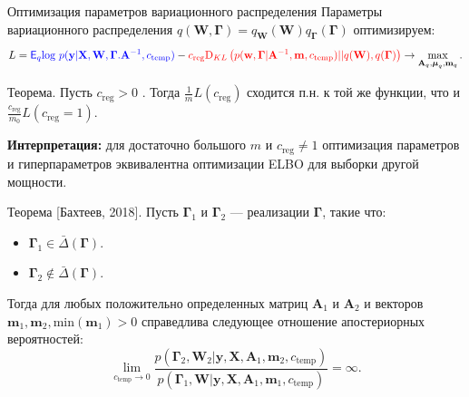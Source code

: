 \documentclass[usenames,dvipsnames,10pt,pdf,utf8,russian,aspectratio=43]{beamer}
\begin{document}
\begin{frame}{Оптимизация параметров вариационного распределения}
\footnotesize
Параметры вариационного распределения $q(\mathbf{W}, \boldsymbol{\Gamma}) = q_{\mathbf{W}}(\mathbf{W})q_{\boldsymbol{\Gamma}}(\boldsymbol{\Gamma})$ оптимизируем:
\[
L =
\textcolor{blue}{\mathsf{E}_q \text{log}~{p(\mathbf{y} | \mathbf{X}, \mathbf{W}, \boldsymbol{\Gamma}. \mathbf{A}^{-1}, c_{\text{temp}})}} - \textcolor{red}{c_\text{reg}\text{D}_{KL}\left(p(\mathbf{w}, \boldsymbol{\Gamma} |\mathbf{A}^{-1}, \mathbf{m}, c_{\text{temp}}) || q(\mathbf{W}), q(\boldsymbol{\Gamma})\right)} \to \max_{\mathbf{A}_q, \boldsymbol{\mu}_q, \mathbf{m}_q}.
\]

\begin{block}{Теорема.}
Пусть $c_\text{reg} > 0$ .
Тогда $\frac{1}{m}L(c_\text{reg})$ сходится п.н. к той же функции, что и $\frac{c_\text{reg}}{m_0}L(c_\text{reg}=1)$.
\end{block}
\textbf{Интерпретация: } для достаточно большого $m$ и $c_\text{reg} \neq 1$ оптимизация параметров и гиперпараметров эквивалентна оптимизации ELBO для выборки другой мощности.


\begin{block}{Теорема  [Бахтеев, 2018].}
Пусть $\boldsymbol{\Gamma}_1$ и $\boldsymbol{\Gamma}_2$ --- реализации $\boldsymbol{\Gamma}$, такие что:
\begin{itemize}
\item $\boldsymbol{\Gamma}_1 \in \bar{\Delta}(\boldsymbol{\Gamma})$.
\item $\boldsymbol{\Gamma}_2 \not \in \bar{\Delta}(\boldsymbol{\Gamma})$.
\end{itemize} 
Тогда для любых положительно определенных матриц $\mathbf{A}_1$ и $\mathbf{A}_2$ и векторов $\mathbf{m}_1, \mathbf{m}_2, \text{min}(\mathbf{m}_1)>0$ справедлива следующее отношение апостериорных вероятностей:
$$\lim_{c_\text{temp} \to 0} \frac{p(\boldsymbol{\Gamma}_2, \mathbf{W}_2|\mathbf{y},  \mathbf{X},\mathbf{A}_1,\mathbf{m}_2, {c_\text{temp}})}{p(\boldsymbol{\Gamma}_1,  \mathbf{W}|\mathbf{y}, \mathbf{X},\mathbf{A}_1,\mathbf{m}_1, {c_\text{temp}})} = \infty.$$
\end{block}
\end{frame}
\end{document}
